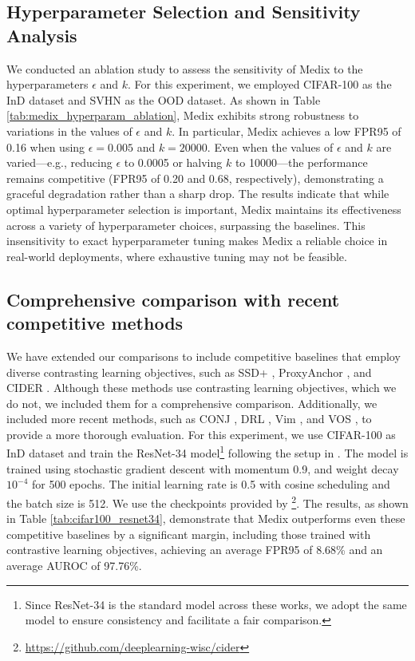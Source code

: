 \documentclass[10pt]{article} %
\theoremstyle{plain}
\theoremstyle{definition}
\begin{document}
\subsection{Hyperparameter Selection and Sensitivity Analysis} \label{appendix:hyperparameter}
We conducted an ablation study to assess the sensitivity of Medix to the hyperparameters $\epsilon$ and $k$. For this experiment, we employed CIFAR-100 as the InD dataset and SVHN as the OOD dataset.
As shown in Table \ref{tab:medix_hyperparam_ablation}, Medix exhibits strong robustness to variations in the values of $\epsilon$ and $k$. 
In particular, Medix achieves a low FPR95 of 0.16 when using \( \epsilon = 0.005 \) and \( k = 20000 \). Even when the values of \( \epsilon \) and \( k \) are varied—e.g., reducing \( \epsilon \) to 0.0005 or halving \( k \) to 10000—the performance remains competitive (FPR95 of 0.20 and 0.68, respectively), demonstrating a graceful degradation rather than a sharp drop. The results indicate that while optimal hyperparameter selection is important, Medix maintains its effectiveness across a variety of hyperparameter choices, surpassing the baselines. 
This insensitivity to exact hyperparameter tuning makes Medix a reliable choice in real-world deployments, where exhaustive tuning may not be feasible.


\subsection{Comprehensive comparison with recent competitive methods} \label{appendix:addtional_baselines}
We have extended our comparisons to include competitive baselines that employ diverse contrasting learning objectives, such as SSD+ \citep{sehwag2021ssd}, ProxyAnchor \citep{9156780}, and CIDER \cite{ming2023how}.
Although these methods use contrasting learning objectives, which we do not, we included them for a comprehensive comparison.
Additionally, we included more recent methods, such as CONJ \citep{peng2024conjnorm}, DRL \citep{zhang2024learning}, Vim \citep{wang2022vim}, and VOS \citep{du2022towards}, to provide a more thorough evaluation.
For this experiment, we use CIFAR-100 as InD dataset and train the ResNet-34 model\footnote{Since ResNet-34 is the standard model across these works, we adopt the same model to ensure consistency and facilitate a fair comparison.} following the setup in \cite{ming2023how, zhang2024learning}. The model is trained using stochastic
gradient descent with momentum 0.9, and weight decay $10^{-4}$ for 500 epochs. The initial learning rate is 0.5 with cosine scheduling and the batch size is 512. We use the checkpoints provided by \cite{ming2023how}\footnote{\url{https://github.com/deeplearning-wisc/cider}}. 
The results, as shown in Table \ref{tab:cifar100_resnet34}, demonstrate that Medix outperforms even these competitive baselines by a significant margin, including those trained with contrastive learning objectives, achieving an average FPR95 of 8.68\% and an average AUROC of 97.76\%.
\end{document}
